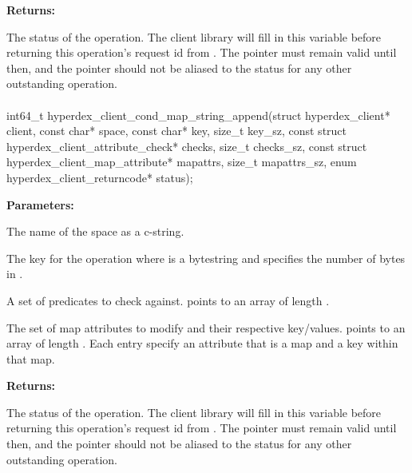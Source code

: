 \noindent\textbf{Returns:}
\begin{description}[labelindent=\widthof{{\code{status}}},leftmargin=*,noitemsep,nolistsep,align=right]
\item[\code{status}] The status of the operation.  The client library will fill in this variable before returning this operation's request id from .  The pointer must remain valid until then, and the pointer should not be aliased to the status for any other outstanding operation.
\end{description}

\paragraph{}
\label{api:c:cond_map_string_append}
\begin{ccode}
int64_t hyperdex_client_cond_map_string_append(struct hyperdex_client* client,
        const char* space,
        const char* key, size_t key_sz,
        const struct hyperdex_client_attribute_check* checks, size_t checks_sz,
        const struct hyperdex_client_map_attribute* mapattrs, size_t mapattrs_sz,
        enum hyperdex_client_returncode* status);
\end{ccode}
\funcdesc 

\noindent\textbf{Parameters:}
\begin{description}[labelindent=\widthof{{\code{mapattrs}, \code{mapattrs\_sz}}},leftmargin=*,noitemsep,nolistsep,align=right]
\item[\code{space}] The name of the space as a c-string.
\item[\code{key}, \code{key\_sz}] The key for the operation where  is a bytestring and  specifies the number of bytes in .
\item[\code{checks}, \code{checks\_sz}] A set of predicates to check against.   points to an array of length .
\item[\code{mapattrs}, \code{mapattrs\_sz}] The set of map attributes to modify and their respective key/values.   points to an array of length .  Each entry specify an attribute that is a map and a key within that map.
\end{description}

\noindent\textbf{Returns:}
\begin{description}[labelindent=\widthof{{\code{status}}},leftmargin=*,noitemsep,nolistsep,align=right]
\item[\code{status}] The status of the operation.  The client library will fill in this variable before returning this operation's request id from .  The pointer must remain valid until then, and the pointer should not be aliased to the status for any other outstanding operation.
\end{description}

